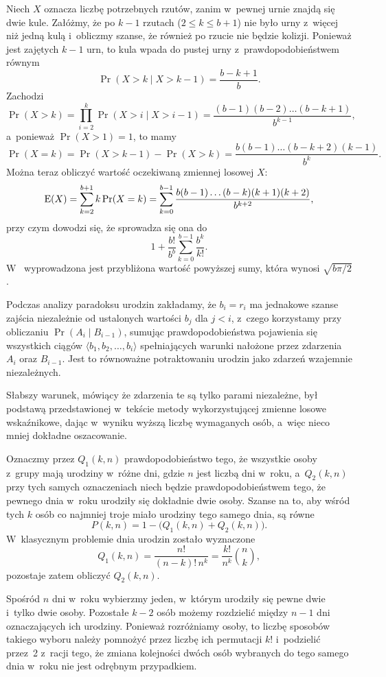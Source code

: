 \exercise %
Niech $X$ oznacza liczbę potrzebnych rzutów, zanim w~pewnej urnie znajdą się dwie kule. Załóżmy, że po $k-1$ rzutach ($2\le k\le b+1$) nie było urny z~więcej niż jedną kulą i~obliczmy szanse, że również po  rzucie nie będzie kolizji. Ponieważ jest zajętych $k-1$ urn, to  kula wpada do pustej urny z~prawdopodobieństwem równym
\[
	\Pr(X>k\mid X>k-1) = \frac{b-k+1}{b}.
\]
Zachodzi
\[
	\Pr(X>k) = \prod_{i=2}^k\Pr(X>i\mid X>i-1) = \frac{(b-1)(b-2)\dots(b-k+1)}{b^{k-1}},
\]
a~ponieważ $\Pr(X>1)=1$, to mamy
\[
	\Pr(X=k) = \Pr(X>k-1)-\Pr(X>k) = \frac{b(b-1)\dots(b-k+2)(k-1)}{b^k}.
\]
Można teraz obliczyć wartość oczekiwaną zmiennej losowej $X$:
\[
	\operatorname{E}(X) = \sum_{k=2}^{b+1}k\Pr(X=k) = \sum_{k=0}^{b-1}\frac{b(b-1)\dots(b-k)(k+1)(k+2)}{b^{k+2}},
\]
przy czym dowodzi się, że sprowadza się ona do
\[
	1+\frac{b!}{b^b}\sum_{k=0}^{b-1}\frac{b^k}{k!}.
\]
W~\cite{taocp1frag} wyprowadzona jest przybliżona wartość powyższej sumy, która wynosi $\sqrt{b\pi/2}$.

\exercise %
Podczas analizy paradoksu urodzin zakładamy, że $b_i=r_i$ ma jednakowe szanse zajścia niezależnie od ustalonych wartości $b_j$ dla $j<i$, z~czego korzystamy przy obliczaniu $\Pr(A_i\mid B_{i-1})$, sumując prawdopodobieństwa pojawienia się wszystkich ciągów $\langle b_1,b_2,\dots,b_i\rangle$ spełniających warunki nałożone przez zdarzenia $A_i$ oraz $B_{i-1}$. Jest to równoważne potraktowaniu urodzin jako zdarzeń wzajemnie niezależnych.

Słabszy warunek, mówiący że zdarzenia te są tylko parami niezależne, był podstawą przedstawionej w~tekście metody wykorzystującej zmienne losowe wskaźnikowe, dając w~wyniku wyższą liczbę wymaganych osób, a~więc nieco mniej dokładne oszacowanie.

\exercise %
Oznaczmy przez $Q_1(k,n)$ prawdopodobieństwo tego, że wszystkie osoby z~grupy  mają urodziny w~różne dni, gdzie $n$ jest liczbą dni w~roku, a~$Q_2(k,n)$ przy tych samych oznaczeniach niech będzie prawdopodobieństwem tego, że pewnego dnia w~roku urodziły się dokładnie dwie osoby. Szanse na to, aby wśród tych $k$ osób co najmniej troje miało urodziny tego samego dnia, są równe
\[
	P(k,n) = 1-\bigl(Q_1(k,n)+Q_2(k,n)\bigr).
\]
W~klasycznym problemie dnia urodzin zostało wyznaczone
\[
	Q_1(k,n) = \frac{n!}{(n-k)!\,n^k} = \frac{k!}{n^k}\binom{n}{k},
\]
pozostaje zatem obliczyć $Q_2(k,n)$.

Spośród $n$ dni w~roku wybierzmy jeden, w~którym urodziły się pewne dwie i~tylko dwie osoby. Pozostałe $k-2$ osób możemy rozdzielić między $n-1$ dni oznaczających ich urodziny. Ponieważ rozróżniamy osoby, to liczbę sposobów takiego wyboru należy pomnożyć przez liczbę ich permutacji $k!$ i~podzielić przez~2 z~racji tego, że zmiana kolejności dwóch osób wybranych do tego samego dnia w~roku nie jest odrębnym przypadkiem.

